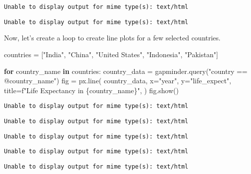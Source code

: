 \documentclass[
  letterpaper,
  DIV=11,
  numbers=noendperiod]{scrreprt}
\newenvironment{Shaded}{\begin{snugshade}}{\end{snugshade}}
\newcommand{\ControlFlowTok}[1]{\textcolor[rgb]{0.00,0.23,0.31}{\textbf{#1}}}
\newcommand{\KeywordTok}[1]{\textcolor[rgb]{0.00,0.23,0.31}{\textbf{#1}}}
\newcommand{\NormalTok}[1]{\textcolor[rgb]{0.00,0.23,0.31}{#1}}
\newcommand{\OperatorTok}[1]{\textcolor[rgb]{0.37,0.37,0.37}{#1}}
\newcommand{\SpecialCharTok}[1]{\textcolor[rgb]{0.37,0.37,0.37}{#1}}
\newcommand{\SpecialStringTok}[1]{\textcolor[rgb]{0.13,0.47,0.30}{#1}}
\newcommand{\StringTok}[1]{\textcolor[rgb]{0.13,0.47,0.30}{#1}}
\begin{document}
\begin{verbatim}
Unable to display output for mime type(s): text/html
\end{verbatim}

\begin{verbatim}
Unable to display output for mime type(s): text/html
\end{verbatim}

Now, let's create a loop to create line plots for a few selected
countries.

\begin{Shaded}
\begin{Highlighting}[]
\NormalTok{countries }\OperatorTok{=}\NormalTok{ [}\StringTok{"India"}\NormalTok{, }\StringTok{"China"}\NormalTok{, }\StringTok{"United States"}\NormalTok{, }\StringTok{"Indonesia"}\NormalTok{, }\StringTok{"Pakistan"}\NormalTok{]}

\ControlFlowTok{for}\NormalTok{ country\_name }\KeywordTok{in}\NormalTok{ countries:}
\NormalTok{    country\_data }\OperatorTok{=}\NormalTok{ gapminder.query(}\StringTok{"country == @country\_name"}\NormalTok{)}
\NormalTok{    fig }\OperatorTok{=}\NormalTok{ px.line(}
\NormalTok{        country\_data,}
\NormalTok{        x}\OperatorTok{=}\StringTok{"year"}\NormalTok{,}
\NormalTok{        y}\OperatorTok{=}\StringTok{"life\_expect"}\NormalTok{,}
\NormalTok{        title}\OperatorTok{=}\SpecialStringTok{f"Life Expectancy in }\SpecialCharTok{\{}\NormalTok{country\_name}\SpecialCharTok{\}}\SpecialStringTok{"}\NormalTok{,}
\NormalTok{    )}
\NormalTok{    fig.show()}
\end{Highlighting}
\end{Shaded}

\begin{verbatim}
Unable to display output for mime type(s): text/html
\end{verbatim}

\begin{verbatim}
Unable to display output for mime type(s): text/html
\end{verbatim}

\begin{verbatim}
Unable to display output for mime type(s): text/html
\end{verbatim}

\begin{verbatim}
Unable to display output for mime type(s): text/html
\end{verbatim}

\begin{verbatim}
Unable to display output for mime type(s): text/html
\end{verbatim}
\end{document}

